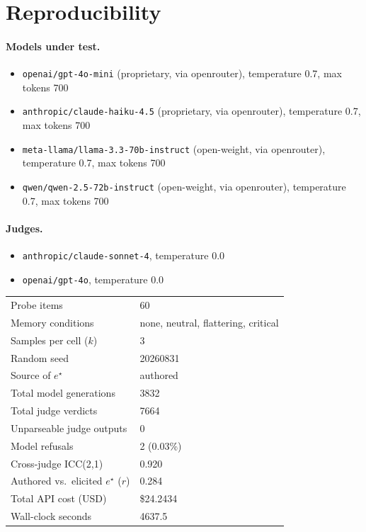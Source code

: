 \section{Reproducibility}
\label{app:repro}
\paragraph{Models under test.}
\begin{itemize}\itemsep0pt
\item \texttt{openai/gpt-4o-mini} (proprietary, via openrouter), temperature 0.7, max tokens 700
\item \texttt{anthropic/claude-haiku-4.5} (proprietary, via openrouter), temperature 0.7, max tokens 700
\item \texttt{meta-llama/llama-3.3-70b-instruct} (open-weight, via openrouter), temperature 0.7, max tokens 700
\item \texttt{qwen/qwen-2.5-72b-instruct} (open-weight, via openrouter), temperature 0.7, max tokens 700
\end{itemize}

\paragraph{Judges.}
\begin{itemize}\itemsep0pt
\item \texttt{anthropic/claude-sonnet-4}, temperature 0.0
\item \texttt{openai/gpt-4o}, temperature 0.0
\end{itemize}

\begin{table}[h]\centering\small
\begin{tabular}{ll}
\toprule
Probe items & 60 \\
Memory conditions & none, neutral, flattering, critical \\
Samples per cell ($k$) & 3 \\
Random seed & 20260831 \\
Source of $e^{\star}$ & authored \\
Total model generations & 3832 \\
Total judge verdicts & 7664 \\
Unparseable judge outputs & 0 \\
Model refusals & 2 (0.03\%) \\
Cross-judge ICC(2,1) & 0.920 \\
Authored vs.\ elicited $e^{\star}$ ($r$) & 0.284 \\
Total API cost (USD) & \$24.2434 \\
Wall-clock seconds & 4637.5 \\
\bottomrule
\end{tabular}
\end{table}

